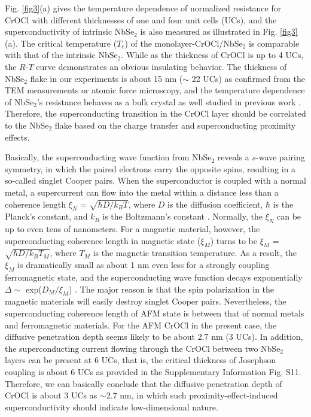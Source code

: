 \documentclass[%
 reprint,
superscriptaddress,
 amsmath,amssymb,
 aps,
]{revtex4-2}
\begin{document}
Fig. \ref{fig3}(a) gives the temperature dependence of normalized resistance for CrOCl with different thicknesses of one and four unit cells (UCs), and the superconductivity of intrinsic NbSe$_2$ is also measured as illustrated in Fig. \ref{fig3}(a). The critical temperature ($T_c$) of the monolayer-CrOCl/NbSe$_2$ is comparable with that of the intrinsic NbSe$_2$. While as the thickness of CrOCl is up to 4 UCs, the $R$-$T$ curve demonstrates an obvious insulating behavior. The thickness of NbSe$_2$ flake in our experiments is about 15 nm ($\sim$ 22 UCs) as confirmed from the TEM measurements or atomic force microscopy, and the temperature dependence of NbSe$_2$'s resistance behaves as a bulk crystal as well studied in previous work \cite{NbSe2}. Therefore, the superconducting transition in the CrOCl layer should be correlated to the NbSe$_2$ flake based on the charge transfer and superconducting proximity effects.

Basically, the superconducting wave function from NbSe$_2$ reveals a $s$-wave pairing symmetry, in which the paired electrons carry the opposite spins, resulting in a so-called singlet Cooper pairs. When the superconductor is coupled with a normal metal, a supercurrent can flow into the metal within a distance less than a coherence length $\xi_N$ = $\sqrt{\hbar D/k_BT} $,  where $D$ is the diffusion coefficient, $\hbar$ is the Planck's constant, and $k_B$ is the Boltzmann's constant \cite{FM/SC}. Normally, the $\xi_N$ can be up to even tens of nanometers. For a magnetic material, however, the superconducting coherence length in magnetic state ($\xi_M$) turns to be $\xi_M$ = $\sqrt{\hbar D/k_BT_M} $, where $T_{M}$ is the magnetic transition temperature. As a result, the $\xi_M$ is dramatically small as about 1 nm even less for a strongly coupling ferromagnetic state, and the superconducting wave function decays exponentially $\Delta \sim$ exp($D_M/\xi_M$) \cite{FM/SC}. The major reason is that the spin polarization in the magnetic materials will easily destroy singlet Cooper pairs. Nevertheless, the superconducting coherence length of AFM state is between that of normal metals and ferromagnetic materials. For the AFM CrOCl in the present case, the diffusive penetration depth seems likely to be about 2.7 nm (3 UCs). In addition, the superconducting current flowing through the CrOCl between two NbSe$_2$ layers can be present at 6 UCs, that is, the critical thickness of Josephson coupling is about 6 UCs as provided in the Supplementary Information Fig. S11. Therefore, we can basically conclude that the diffusive penetration depth of CrOCl is about 3 UCs as $\sim$2.7 nm, in which such proximity-effect-induced superconductivity should indicate low-dimensional nature.
\end{document}
